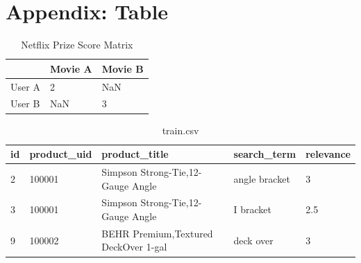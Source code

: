 \documentclass[11pt, titlepage]{article}
\begin{document}
 
\newpage

\section*{Appendix: Table}


\begin{table}[H]
\centering
\label{my-label}
\begin{tabular}{|l|l|l|}
\hline
       & Movie A & Movie B \\ \hline
User A & 2       & NaN       \\ \hline
User B & NaN       & 3       \\ \hline
\end{tabular}
\caption{Netflix Prize Score Matrix}
\end{table}

\begin{table}[H]
\centering
\label{my-label}
\begin{tabular}{|l|l|l|l|l|}
\hline
id & product\_uid & product\_title                       & search\_term  & relevance \\ \hline
2  & 100001       & Simpson Strong-Tie,12-Gauge Angle    & angle bracket & 3         \\ \hline
3  & 100001       & Simpson Strong-Tie,12-Gauge Angle    & I bracket     & 2.5       \\ \hline
9  & 100002       & BEHR Premium,Textured DeckOver 1-gal & deck over     & 3         \\ \hline
\end{tabular}
\caption{train.csv}
\end{table}
\end{document}
